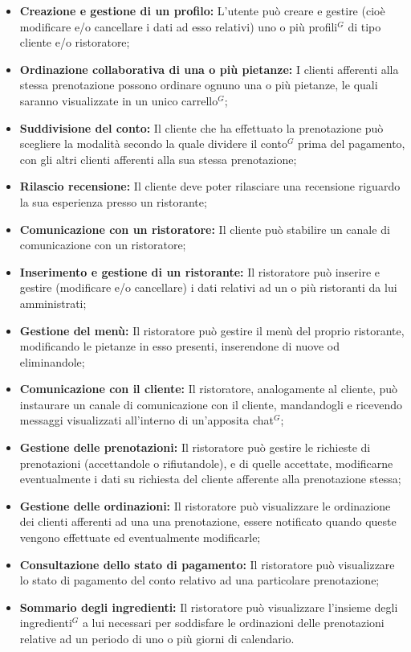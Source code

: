 \begin{itemize}
    \item \textbf{Creazione e gestione di un profilo:} L'utente può creare e gestire (cioè modificare e/o cancellare i dati ad esso relativi) uno o più profili$^{G}$ di tipo cliente e/o ristoratore;
    \item \textbf{Ordinazione collaborativa di una o più pietanze:} I clienti afferenti alla stessa prenotazione possono ordinare ognuno una o più pietanze, le quali saranno visualizzate in un unico carrello$^{G}$;
    \item \textbf{Suddivisione del conto:} Il cliente che ha effettuato la prenotazione può scegliere la modalità secondo la quale dividere il conto$^{G}$ prima del pagamento, con gli altri clienti afferenti alla sua stessa prenotazione;
    \item \textbf{Rilascio recensione:} Il cliente deve poter rilasciare una recensione riguardo la sua esperienza presso un ristorante;
    \item \textbf{Comunicazione con un ristoratore:} Il cliente può stabilire un canale di comunicazione con un ristoratore;
    \item \textbf{Inserimento e gestione di un ristorante:} Il ristoratore può inserire e gestire (modificare e/o cancellare) i dati relativi ad un o più ristoranti da lui amministrati;
    \item \textbf{Gestione del menù:} Il ristoratore può gestire il menù del proprio ristorante, modificando le pietanze in esso presenti, inserendone di nuove od eliminandole;
    \item \textbf{Comunicazione con il cliente:} Il ristoratore, analogamente al cliente, può instaurare un canale di comunicazione con il cliente, mandandogli e ricevendo messaggi visualizzati all'interno di un'apposita chat$^{G}$;
    \item \textbf{Gestione delle prenotazioni:} Il ristoratore può gestire le richieste di prenotazioni (accettandole o rifiutandole), e di quelle accettate, modificarne eventualmente i dati su richiesta del cliente afferente alla prenotazione stessa;
    \item \textbf{Gestione delle ordinazioni:} Il ristoratore può visualizzare le ordinazione dei clienti afferenti ad una una prenotazione, essere notificato quando queste vengono effettuate ed eventualmente modificarle;
    \item \textbf{Consultazione dello stato di pagamento:} Il ristoratore può visualizzare lo stato di pagamento del conto relativo ad una particolare prenotazione;
    \item \textbf{Sommario degli ingredienti:} Il ristoratore può visualizzare l'insieme degli ingredienti$^{G}$ a lui necessari per soddisfare le ordinazioni delle prenotazioni relative ad un periodo di uno o più giorni di calendario.
\end{itemize}
